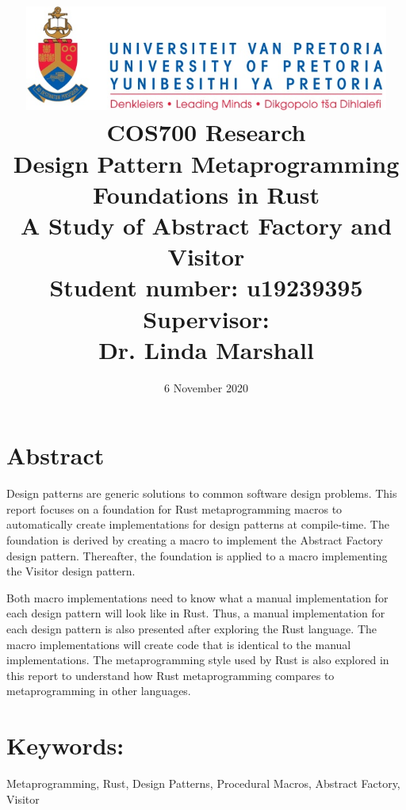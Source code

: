 \documentclass[a4paper,10pt]{article}
\title
{
   \includegraphics[width=12cm]{up_logo.png} \\
   \vspace{2cm}
   \textbf{COS700 Research} \\ \vspace{0.5cm}
   \textbf{Design Pattern Metaprogramming Foundations in Rust\\ \large A Study of Abstract Factory and Visitor} \\ \vspace{0.5cm}
   \textbf{Student number:} u19239395 \\ \vspace{0.5cm}
   \textbf{Supervisor}: \\ Dr. Linda Marshall
}
\date{6 November 2020}
\begin{document}
\author{}

\maketitle
{}

\newpage
\linespread{1.25}

\section*{Abstract}
Design patterns are generic solutions to common software design problems.
This report focuses on a foundation for Rust metaprogramming macros to automatically create implementations for design patterns at compile-time.
The foundation is derived by creating a macro to implement the Abstract Factory design pattern.
Thereafter, the foundation is applied to a macro implementing the Visitor design pattern.

Both macro implementations need to know what a manual implementation for each design pattern will look like in Rust.
Thus, a manual implementation for each design pattern is also presented after exploring the Rust language.
The macro implementations will create code that is identical to the manual implementations.
The metaprogramming style used by Rust is also explored in this report to understand how Rust metaprogramming compares to metaprogramming in other languages.

\section*{Keywords:}
Metaprogramming,
Rust,
Design Patterns,
Procedural Macros,
Abstract Factory,
Visitor

\newpage
{}












\end{document}
